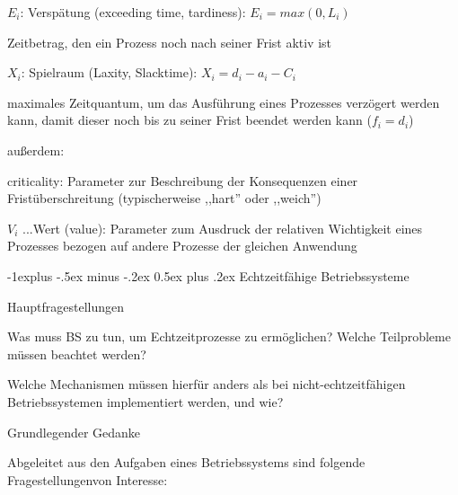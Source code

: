 \documentclass[a4paper]{article}
\makeatletter
\renewcommand{\subsection}{\@startsection{subsection}{2}{0mm}%
 {-1explus -.5ex minus -.2ex}%
 {0.5ex plus .2ex}%
 {\normalfont\normalsize\bfseries}}
\makeatother
\begin{document}
\begin{multicols}{3}
\begin{itemize*}
        \item
        $E_i$: Verspätung (exceeding time, tardiness): $E_i= max(0,
            L_i)$
        \begin{itemize*}
            \item Zeitbetrag, den ein Prozess noch nach seiner Frist aktiv ist
        \end{itemize*}
        \item
        $X_i$: Spielraum (Laxity, Slacktime): $X_i = d_i - a_i - C_i$
        \begin{itemize*}
            \item maximales Zeitquantum, um das Ausführung eines Prozesses verzögert werden kann, damit dieser noch bis zu seiner Frist beendet werden kann ($f_i=d_i$)
        \end{itemize*}
        \item
        außerdem:
        \begin{itemize*}
            \item criticality: Parameter zur Beschreibung der Konsequenzen einer Fristüberschreitung (typischerweise ,,hart'' oder ,,weich'')
            \item $V_i$ ...Wert (value): Parameter zum Ausdruck der relativen Wichtigkeit eines Prozesses bezogen auf andere Prozesse der gleichen Anwendung
        \end{itemize*}
    \end{itemize*}


    \subsection{Echtzeitfähige
        Betriebssysteme}

    \begin{itemize*}
        \item
        Hauptfragestellungen
        \begin{enumerate*}

            \item Was muss BS zu tun, um Echtzeitprozesse zu ermöglichen? Welche Teilprobleme müssen beachtet werden?
            \item Welche Mechanismen müssen hierfür anders als bei nicht-echtzeitfähigen Betriebssystemen implementiert werden, und wie?
        \end{enumerate*}
        \item
        Grundlegender Gedanke
        \begin{itemize*}
            \item Abgeleitet aus den Aufgaben eines Betriebssystems sind folgende Fragestellungenvon Interesse:
        \end{itemize*}
        \begin{enumerate*}


\end{enumerate*}
\end{itemize*}
\end{multicols}
\end{document}
